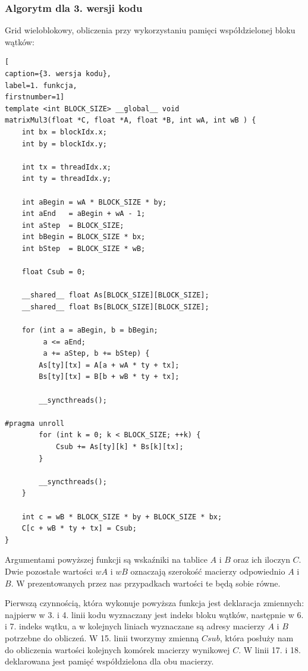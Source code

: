 \documentclass{article}
\begin{document}
\subsubsection{Algorytm dla 3. wersji kodu}
Grid wieloblokowy, obliczenia przy wykorzystaniu pamięci współdzielonej bloku wątków:
\begin{lstlisting}[
caption={3. wersja kodu},
label=1. funkcja,
firstnumber=1]
template <int BLOCK_SIZE> __global__ void
matrixMul3(float *C, float *A, float *B, int wA, int wB ) {
    int bx = blockIdx.x;
    int by = blockIdx.y;
    
    int tx = threadIdx.x;
    int ty = threadIdx.y;
    
    int aBegin = wA * BLOCK_SIZE * by;
    int aEnd   = aBegin + wA - 1;
    int aStep  = BLOCK_SIZE;
    int bBegin = BLOCK_SIZE * bx;
    int bStep  = BLOCK_SIZE * wB;
    
    float Csub = 0;

    __shared__ float As[BLOCK_SIZE][BLOCK_SIZE];
    __shared__ float Bs[BLOCK_SIZE][BLOCK_SIZE];

    for (int a = aBegin, b = bBegin; 
    	 a <= aEnd;
    	 a += aStep, b += bStep) {
        As[ty][tx] = A[a + wA * ty + tx];
        Bs[ty][tx] = B[b + wB * ty + tx];
        
        __syncthreads();
        
#pragma unroll
        for (int k = 0; k < BLOCK_SIZE; ++k) {
            Csub += As[ty][k] * Bs[k][tx];
        }

        __syncthreads();
    }
    
    int c = wB * BLOCK_SIZE * by + BLOCK_SIZE * bx;
    C[c + wB * ty + tx] = Csub;    
}
\end{lstlisting}

Argumentami powyższej funkcji są wskaźniki na tablice $A$ i $B$ oraz ich iloczyn $C$. Dwie pozostałe wartości $wA$ i $wB$ oznaczają szerokość macierzy odpowiednio $A$ i $B$. W prezentowanych przez nas przypadkach wartości te będą sobie równe.

Pierwszą czynnością, która wykonuje powyższa funkcja jest deklaracja zmiennych: najpierw w 3. i 4. linii kodu wyznaczany jest indeks bloku wątków, następnie w 6. i 7. indeks wątku, a w kolejnych liniach wyznaczane są adresy macierzy $A$ i $B$ potrzebne do obliczeń. W 15. linii tworzymy zmienną $Csub$, która posłuży nam do obliczenia wartości kolejnych komórek macierzy wynikowej $C$. W linii 17. i 18. deklarowana jest pamięć współdzielona dla obu macierzy.
\end{document}
